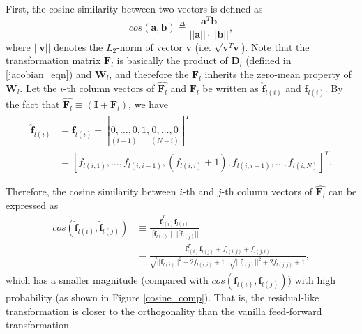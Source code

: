First, the cosine similarity between two vectors is defined as
\begin{equation}
    cos(\mathbf{a}, \mathbf{b}) \overset{\Delta}{=}
    \frac{\mathbf{a}^T\mathbf{b}}{||\mathbf{a}||\cdot||\mathbf{b}||},
    \label{def_cosine}
\end{equation}
where $||\mathbf{v}||$ denotes the $L_2$-norm of vector $\mathbf{v}$
(i.e. $\sqrt{\mathbf{v}^T\mathbf{v}}$).
Note that the transformation matrix $\mathbf{F}_l$ is basically the product of $\mathbf{D}_l$
(defined in \eqref{jacobian_eqn}) and $\mathbf{W}_l$, and therefore the $\mathbf{F}_l$ inherits
the zero-mean property of $\mathbf{W}_l$.
Let the $i$-th column vectors of $\widehat{\mathbf{F}_l}$ and $\mathbf{F}_l$ be written as
$\widehat{\mathbf{f}}_{l(i)}$ and $\mathbf{f}_{l(i)}$.
By the fact that $\widehat{\mathbf{F}_l}\equiv(\mathbf{I}+\mathbf{F}_l)$, we have
\begin{equation}
    \begin{aligned}
    \widehat{\mathbf{f}}_{l(i)}
    &=\mathbf{f}_{l(i)}+[\underset{(i-1)}{0, \dots, 0}, 1, \underset{(N-i)}{0, \dots, 0}]^T\\
    &=[f_{l(i,1)},\dots,f_{l(i,i-1)},(f_{l(i,i)}+1),f_{l(i,i+1)},\dots,f_{l(i,N)}]^T.
    \end{aligned}
    \label{hat_iden_add}
\end{equation}

Therefore, the cosine similarity between $i$-th and $j$-th column vectors of
$\widehat{\mathbf{F}_l}$ can be expressed as
\begin{equation}
    \begin{aligned}
        cos(\widehat{\mathbf{f}}_{l(i)}, \widehat{\mathbf{f}}_{l(j)})
        &\equiv\frac
        {\widehat{\mathbf{f}}_{l(i)}^T\widehat{\mathbf{f}}_{l(j)}}
        {||\widehat{\mathbf{f}}_{l(i)}||\cdot||\widehat{\mathbf{f}}_{l(j)}||}\\
        &=\frac
        {\mathbf{f}_{l(i)}^T\mathbf{f}_{l(j)}+f_{l(i,j)}+f_{l(j,i)}}
        {\sqrt{||\mathbf{f}_{l(i)}||^2+2f_{l(i,i)}+1}\cdot\sqrt{||\mathbf{f}_{l(j)}||^2+2f_{l(j,j)}+1}},
    \end{aligned}
    \label{res_cosine}
\end{equation}
which has a smaller magnitude (compared with $cos(\mathbf{f}_{l(i)}, \mathbf{f}_{l(j)})$) with high
probability (as shown in Figure \ref{cosine_comp}).
That is, the residual-like transformation is closer to the orthogonality than the vanilla
feed-forward transformation.

